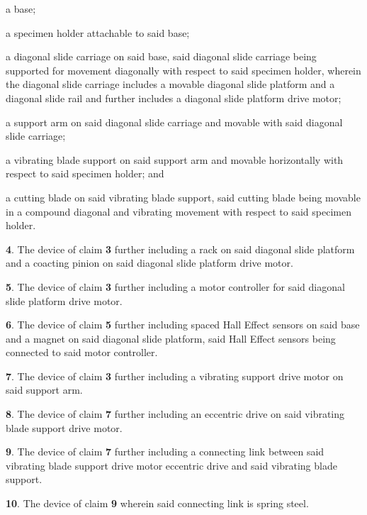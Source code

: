 \documentclass{article}
\begin{document}
\begin{hangpars}
\hspace*{1.5em}a base;

\hspace*{1.5em}a specimen holder attachable to said base;

\hspace*{1.5em}a diagonal slide carriage on said base, said diagonal slide carriage being supported for movement diagonally with respect to said specimen holder, wherein the diagonal slide carriage includes a movable diagonal slide platform and a diagonal slide rail and further includes a diagonal slide platform drive motor;

\hspace*{1.5em}a support arm on said diagonal slide carriage and movable with said diagonal slide carriage;

\hspace*{1.5em}a vibrating blade support on said support arm and movable horizontally with respect to said specimen holder; and

\hspace*{1.5em}a cutting blade on said vibrating blade support, said cutting blade being movable in a compound diagonal and vibrating movement with respect to said specimen holder.

\textbf{4}. The device of claim \textbf{3} further including a rack on said diagonal slide platform and a coacting pinion on said diagonal slide platform drive motor.

\textbf{5}. The device of claim \textbf{3} further including a motor controller for said diagonal slide platform drive motor.

\textbf{6}. The device of claim \textbf{5} further including spaced Hall Effect sensors on said base and a magnet on said diagonal slide platform, said Hall Effect sensors being connected to said motor controller.

\textbf{7}. The device of claim \textbf{3} further including a vibrating support drive motor on said support arm.

\textbf{8}. The device of claim \textbf{7} further including an eccentric drive on said vibrating blade support drive motor.

\textbf{9}. The device of claim \textbf{7} further including a connecting link between said vibrating blade support drive motor eccentric drive and said vibrating blade support.

\textbf{10}. The device of claim \textbf{9} wherein said connecting link is spring steel.


\end{hangpars}
\end{document}
